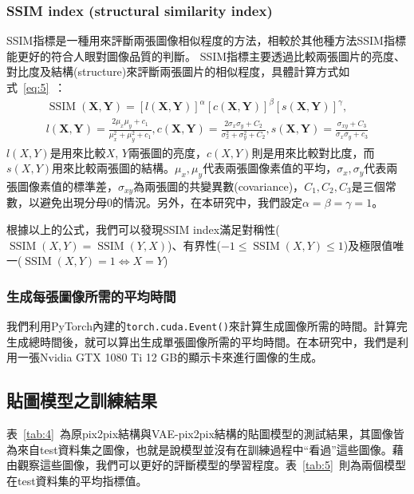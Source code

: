 \documentclass[a4paper, 12pt]{article}
\begin{document}
\subsubsection{SSIM index (structural similarity index)}
SSIM指標\cite{wang2004image}是一種用來評斷兩張圖像相似程度的方法，相較於其他種方法SSIM指標能更好的符合人眼對圖像品質的判斷。
SSIM指標主要透過比較兩張圖片的亮度、對比度及結構(structure)來評斷兩張圖片的相似程度，具體計算方式如式~\ref{eq:5}~：
\begin{equation}
    \begin{array}{l}
        \operatorname{SSIM}(\mathbf{X}, \mathbf{Y})=[l(\mathbf{X}, \mathbf{Y})]^{\alpha}[c(\mathbf{X}, \mathbf{Y})]^{\beta}[s(\mathbf{X}, \mathbf{Y})]^{\gamma}, \\
        l(\mathbf{X}, \mathbf{Y})=\frac{2 \mu_{x} \mu_{y}+c_{1}}{\mu_{x}^{2}+\mu_{y}^{2}+c_{1}}, c(\mathbf{X}, \mathbf{Y})=\frac{2 \sigma_{x} \sigma_{y}+C_{2}}{\sigma_{x}^{2}+\sigma_{y}^{2}+C_{2}}, s(\mathbf{X}, \mathbf{Y})=\frac{\sigma_{x y}+C_{3}}{\sigma_{x} \sigma_{y}+c_{3}}
    \end{array}
    \label{eq:5}
\end{equation}
$l(X,Y)$是用來比較$X$, $Y$兩張圖的亮度，$c(X,Y)$則是用來比較對比度，而$s(X,Y)$用來比較兩張圖的結構。$\mu_x,\mu_y$代表兩張圖像素值的平均，$\sigma_x,\sigma_y$代表兩張圖像素值的標準差，$\sigma_{xy}$為兩張圖的共變異數(covariance)，$C_1,C_2,C_3$是三個常數，以避免出現分母0的情況。另外，在本研究中，我們設定$\alpha=\beta=\gamma=1$。

根據以上的公式，我們可以發現SSIM index滿足對稱性($\operatorname{SSIM}(X,Y)=\operatorname{SSIM}(Y,X)$)、有界性($-1\leq \operatorname{SSIM}(X,Y)\leq 1$)及極限值唯一($\operatorname{SSIM}(X,Y)=1 \Longleftrightarrow X=Y$)

\subsubsection{生成每張圖像所需的平均時間}

我們利用PyTorch內建的\texttt{torch.cuda.Event()}來計算生成圖像所需的時間。計算完生成總時間後，就可以算出生成單張圖像所需的平均時間。在本研究中，我們是利用一張Nvidia GTX 1080 Ti 12 GB的顯示卡來進行圖像的生成。

\subsection{貼圖模型之訓練結果}

表~\ref{tab:4}~為原pix2pix結構與VAE-pix2pix結構的貼圖模型的測試結果，其圖像皆為來自test資料集之圖像，也就是說模型並沒有在訓練過程中“看過”這些圖像。藉由觀察這些圖像，我們可以更好的評斷模型的學習程度。表~\ref{tab:5}~則為兩個模型在test資料集的平均指標值。
\end{document}
